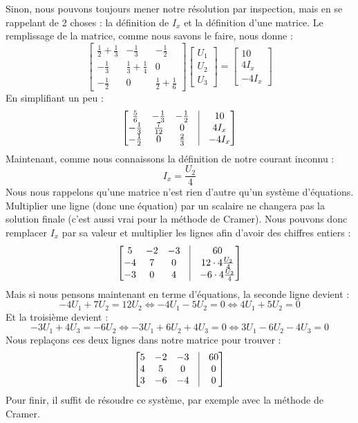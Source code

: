 \documentclass[12pt,a4paper]{article}
\begin{document}
Sinon, nous pouvons toujours mener notre résolution par inspection, mais en se rappelant de 2 choses : la définition de $I_x$ et la définition d'une matrice. Le remplissage de la matrice, comme nous savons le faire, nous donne :
\[\begin{bmatrix}
	\frac{1}{2} + \frac{1}{3} & -\frac{1}{3} & -\frac{1}{2} \\
	-\frac{1}{3} & \frac{1}{3} + \frac{1}{4} & 0\\
	-\frac{1}{2} & 0 &\frac{1}{2} + \frac{1}{6}
	\end{bmatrix}\begin{bmatrix}
	U_1\\
	U_2\\
	U_3
	\end{bmatrix} = \begin{bmatrix}
		10\\
		4 I_x\\
		-4I_x
	\end{bmatrix}\]
En simplifiant un peu :
\[\begin{bmatrix}
	\frac{5}{6} & -\frac{1}{3} & -\frac{1}{2} &\vline & 10\\
	-\frac{1}{3} & \frac{7}{12} & 0 & \vline & 4I_x\\
	-\frac{1}{2} & 0 & \frac{2}{3} & \vline & -4I_x
\end{bmatrix}\]
Maintenant, comme nous connaissons la définition de notre courant inconnu :
\[I_x = \frac{U_2}{4}\]
Nous nous rappelons qu'une matrice n'est rien d'autre qu'un système d'équations. Multiplier une ligne (donc une équation) par un scalaire ne changera pas la solution finale (c'est aussi vrai pour la méthode de Cramer). Nous pouvons donc remplacer $I_x$ par sa valeur et multiplier les lignes afin d'avoir des chiffres entiers :
\[\begin{bmatrix}
	5 & -2 & -3 & \vline & 60\\
	-4 & 7 & 0 & \vline & 12\cdot 4\frac{U_2}{4}\\
	-3 & 0 & 4 & \vline & -6 \cdot 4\frac{U_2}{4}
\end{bmatrix}\]
Mais si nous pensons maintenant en terme d'équations, la seconde ligne devient :
\[-4 U_1 + 7 U_2 = 12 U_2 \iff -4 U_1 - 5U_2 = 0 \iff 4U_1 + 5U_2 = 0\]
Et la troisième devient :
\[-3 U_1 + 4U_3 = -6 U_2 \iff -3U_1 + 6 U_2 + 4 U_3 = 0 \iff 3 U_1 - 6 U_2 - 4 U_3 = 0\]
Nous replaçons ces deux lignes dans notre matrice pour trouver :
\[\begin{bmatrix}
	5 & -2 & -3 & \vline & 60\\
	4 & 5 & 0 & \vline & 0\\
	3 & -6 & -4 & \vline & 0	
\end{bmatrix}\]
Pour finir, il suffit de résoudre ce système, par exemple avec la méthode de Cramer.
\end{document}
